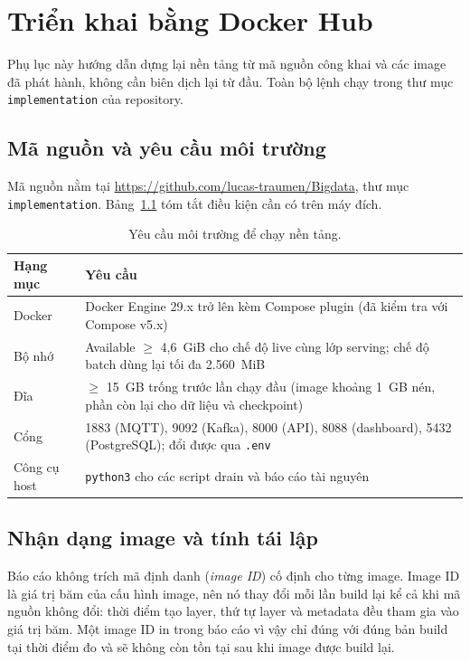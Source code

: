 \chapter{Triển khai bằng Docker Hub}
\label{app:deployment}

Phụ lục này hướng dẫn dựng lại nền tảng từ mã nguồn công khai và các image đã
phát hành, không cần biên dịch lại từ đầu. Toàn bộ lệnh chạy trong thư mục
\texttt{implementation} của repository.

\section{Mã nguồn và yêu cầu môi trường}

Mã nguồn nằm tại \url{https://github.com/lucas-traumen/Bigdata}, thư mục
\texttt{implementation}. Bảng~\ref{tab:deploy-requirements} tóm tắt điều kiện
cần có trên máy đích.

\begin{table}[H]
\centering
\caption{Yêu cầu môi trường để chạy nền tảng.}
\label{tab:deploy-requirements}
\small
\begin{tabularx}{\textwidth}{>{\raggedright\arraybackslash}p{3.4cm} X}
\toprule
\textbf{Hạng mục} & \textbf{Yêu cầu} \\
\midrule
Docker & Docker Engine 29.x trở lên kèm Compose plugin (đã kiểm tra với Compose v5.x) \\
Bộ nhớ & Available $\geq$ 4,6~GiB cho chế độ live cùng lớp serving; chế độ batch dùng lại tối đa 2.560~MiB \\
Đĩa & $\geq$ 15~GB trống trước lần chạy đầu (image khoảng 1~GB nén, phần còn lại cho dữ liệu và checkpoint) \\
Cổng & 1883 (MQTT), 9092 (Kafka), 8000 (API), 8088 (dashboard), 5432 (PostgreSQL); đổi được qua \texttt{.env} \\
Công cụ host & \texttt{python3} cho các script drain và báo cáo tài nguyên \\
\bottomrule
\end{tabularx}
\end{table}

\section{Nhận dạng image và tính tái lập}
\label{app:image-identity}

Báo cáo không trích mã định danh (\emph{image ID}) cố định cho từng image.
Image ID là giá trị băm của cấu hình image, nên nó thay đổi mỗi lần build lại
kể cả khi mã nguồn không đổi: thời điểm tạo layer, thứ tự layer và metadata
đều tham gia vào giá trị băm. Một image ID in trong báo cáo vì vậy chỉ đúng
với đúng bản build tại thời điểm đo và sẽ không còn tồn tại sau khi image được
build lại.

